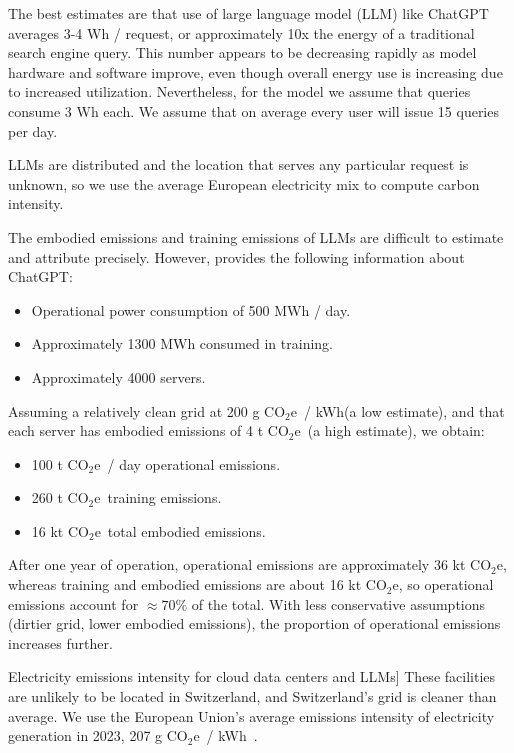 \documentclass[11pt]{article}
\newcommand{\coe}{CO$_2$e}
\newcommand{\gcoe}{g \coe}
\newcommand{\gcoekwh}{\gcoe\ / kWh}
\begin{document}
The best estimates are that use of large language model (LLM) like ChatGPT averages 3-4 Wh / request, or approximately 10x the energy of a traditional search engine query. This number appears to be decreasing rapidly as model hardware and software improve, even though overall energy use is increasing due to increased utilization. Nevertheless, for the model we assume that queries consume 3 Wh each. We assume that on average every user will issue 15 queries per day.

LLMs are distributed and the location that serves any particular request is unknown, so we use the average European electricity mix to compute carbon intensity.

The embodied emissions and training emissions of LLMs are difficult to estimate and attribute precisely. However, \textcite{devries2023growing} provides the following information about ChatGPT:
\begin{itemize}
  \item Operational power consumption of 500 MWh / day.
  \item Approximately 1300 MWh consumed in training.
  \item Approximately 4000 servers.
\end{itemize}

Assuming a relatively clean grid at 200 \gcoekwh (a low estimate), and that each server has embodied emissions of 4 t \coe\ (a high estimate), we obtain:
\begin{itemize}
  \item 100 t \coe\ / day operational emissions.
  \item 260 t \coe\ training emissions.
  \item 16 kt \coe\ total embodied emissions.
\end{itemize}

After one year of operation, operational emissions are approximately 36 kt \coe, whereas training and embodied emissions are about 16 kt \coe, so operational emissions account for $\approx 70\%$ of the total. With less conservative assumptions (dirtier grid, lower embodied emissions), the proportion of operational emissions increases further.

Electricity emissions intensity for cloud data centers and LLMs] These facilities are unlikely to be located in Switzerland, and Switzerland's grid is cleaner than average. We use the European Union's average emissions intensity of electricity generation in 2023, 207 \gcoekwh~\cite{eea:emissions:2025}.
\end{document}

